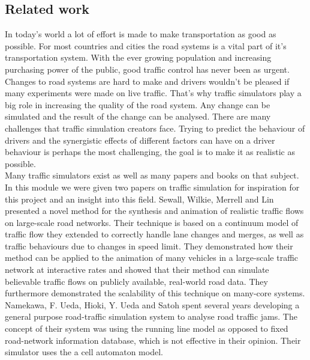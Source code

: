 \documentclass[11pt]{article}
\begin{document}
\subsection{Related work}
In today's world a lot of effort is made to make transportation as good as possible. For most countries and cities the road systems is a vital part of it's transportation system. With the ever growing population and increasing purchasing power of the public, good traffic control has never been as urgent. Changes to road systems are hard to make and drivers wouldn't be pleased if many experiments were made on live traffic. That's why traffic simulators play a big role in increasing the quality of the road system. Any change can be simulated and the result of the change can be analysed. There are many challenges that traffic simulation creators face. Trying to predict the behaviour of drivers and the synergistic effects of different factors can have on a driver behaviour is perhaps the most challenging, the goal is to make it as realistic as possible.\\

Many traffic simulators exist as well as many papers and books on that subject. In this module we were given two papers on traffic simulation for inspiration for this project and an insight into this field. Sewall, Wilkie, Merrell and Lin \cite{sewall2010continuum}presented a novel method for the synthesis and animation of realistic traffic flows on large-scale road networks. Their technique is based on a continuum model of traffic flow they extended to correctly handle lane changes and merges, as well as traffic behaviours due to changes in speed limit. They demonstrated how their method can be applied to the animation of many vehicles in a large-scale traffic network at interactive rates and showed that their method can simulate believable traffic flows on publicly available, real-world road data. They furthermore demonstrated the scalability of this technique on many-core systems.\\

Namekawa, F. Ueda, Hioki, Y. Ueda and Satoh \cite{namekawa2005general} spent several years developing a general purpose road-traffic simulation system to analyse road traffic jams. The concept of their system was using the running line model as opposed to fixed road-network information database, which is not effective in their opinion. Their simulator uses the a cell automaton model.
\end{document}
